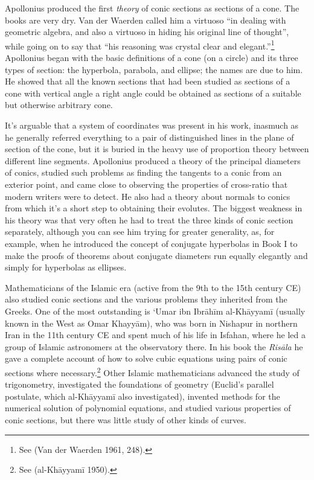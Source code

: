 Apollonius produced the first \emph{theory} of conic sections as sections of a cone. 
The books are very dry. Van der Waerden called him a virtuoso ``in dealing with geometric algebra, and also a virtuoso in hiding his original line of thought'', while going on to say that ``his reasoning was crystal clear and elegant.''\footnote{See (Van der Waerden 1961, 248).}
Apollonius began with the basic definitions of a cone (on a circle) and its three types of section: the hyperbola, parabola, and ellipse; the names are due to him. He showed that all the known sections that had been studied as sections of a cone with vertical angle a right angle could be obtained as sections of a suitable but otherwise arbitrary cone.

It's  arguable that a system of coordinates was present in his work, inasmuch as he generally referred everything to a pair of distinguished lines in the plane of section of the cone, but it is buried in the heavy use of proportion theory between different line segments. 
Apollonius produced a theory of the principal diameters of conics, studied such problems as finding the tangents to a conic from an exterior point, and came close to observing the properties of cross-ratio that modern writers were to detect. He also had a theory about normals to conics from which  it's a short step to obtaining their evolutes. 
The biggest weakness in his theory was that very often he had to treat the three kinds of conic section separately, although you can see him trying for greater generality, as, for example, when he introduced the concept of conjugate hyperbolas in Book I to make the proofs of theorems about conjugate diameters run equally elegantly and simply for hyperbolas as ellipses.




Mathematicians of the Islamic era  (active from the 9th to the 15th
century CE)
also studied conic sections and the various problems they inherited from the Greeks. One of the most outstanding is `Umar ibn Ibr\={a}h\={i}m al-Kh\={a}yyam\={i} (usually known in the West as Omar Khayy\={a}m), who was born in Nishapur in northern Iran  in the 11th century CE and spent much of his life in Isfahan, where he led a group of Islamic astronomers at the observatory there. In his book the \emph{Ris\={a}la} he 
 gave a complete account of how to solve cubic equations using pairs of conic sections where necessary.\footnote{See (al-Kh\={a}yyam\={i} 1950).} Other Islamic mathematicians advanced the study of trigonometry, investigated the foundations of geometry (Euclid's parallel postulate, which al-Kh\={a}yyam\={i} also investigated), invented methods for the numerical solution of polynomial equations, and studied various properties of conic sections, but there was little study of other kinds of curves. 
 
